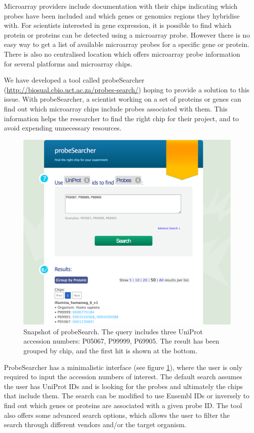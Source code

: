 Microarray providers include documentation with their chips indicating which probes have been included and which genes or genomics regions they hybridise with. For scientists interested in gene expression, it is possible to find which protein or proteins can be detected using a microarray probe. However there is no easy way to get a list of available microarray probes for a specific gene or protein. There is also no centralised location which offers microarray probe information for several platforms and microarray chips.

We have developed a tool called probeSearcher (\url{http://biosual.cbio.uct.ac.za/probes-search/}) hoping to provide a solution to this issue. With probeSearcher, a scientist working on a set of proteins or genes can find out which microarray chips include probes associated with them. This information helps the researcher to find the right chip for their project, and to avoid expending unnecessary resources. 

\begin{figure}  
\centering
\includegraphics[width=\textwidth]{figures/probesearch.png}
\caption[Snapshot of probeSearch.]{Snapshot of probeSearch. The query includes three UniProt accession numbers: P05067, P99999, P69905. The result has been grouped by chip, and the first hit is shown at the bottom.
\label{fig:probesearch}}
\end{figure}

ProbeSearcher has a minimalistic interface (see figure \ref{fig:probesearch}), where the user is only required to input the accession numbers of interest. The default search assumes the user has UniProt IDs and is looking for the probes and ultimately the chips that include them. The search can be modified to use Ensembl IDs or inversely to find out which genes or proteins are associated with a given probe ID. The tool also offers some advanced search options, which allows the user to filter the search through different vendors and/or the target organism. 

